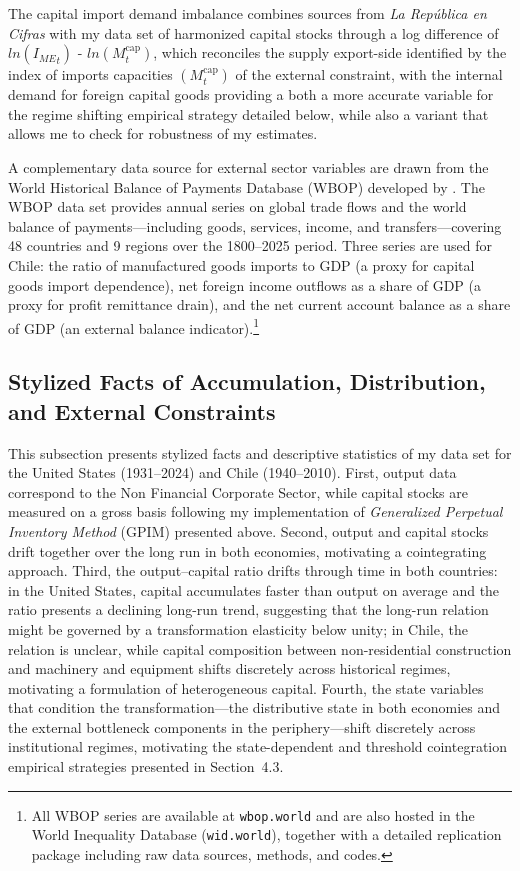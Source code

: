 The capital import demand imbalance combines sources from \textit{La República en Cifras} with my data set of harmonized capital stocks through a log difference of $ln({I_{ME}}_t)$ - $ln(M^{\text{cap}}_t)$, which reconciles the supply export-side identified by the index of imports capacities $(M^{\text{cap}}_t)$ of the external constraint, with the internal demand for foreign capital goods providing a both a more accurate variable for the regime shifting empirical strategy detailed below, while also a variant that allows me to check for robustness of my estimates. 

A complementary data source for external sector variables are drawn from the World Historical Balance of Payments Database (WBOP) developed by
\citet{NievasPiketty2025}. The WBOP data set provides annual series on global trade flows and the world balance of payments---including goods,
services, income, and transfers---covering 48 countries and 9 regions over
the 1800--2025 period. Three series are used for Chile: the ratio
of manufactured goods imports to GDP (a proxy for capital goods
import dependence), net foreign income outflows as a share of GDP (a
proxy for profit remittance drain), and the net current account
balance as a share of GDP (an external balance indicator).\footnote{All WBOP
	series are available at \texttt{wbop.world} and are also hosted in
	the World Inequality Database (\texttt{wid.world}), together with a
	detailed replication package including raw data sources, methods,
	and codes.}



\subsection{Stylized Facts of Accumulation, Distribution, and External Constraints}
\label{sec:4:stylized_facts}

This subsection presents stylized facts and descriptive statistics of my data set for the United States (1931--2024) and Chile (1940--2010). First, output data correspond to the Non Financial Corporate Sector, while capital stocks are measured on a gross basis following my implementation of \citet{Shaikh2016} \textit{Generalized Perpetual Inventory Method} (GPIM) presented above. Second, output and capital stocks drift together over the long run in both economies, motivating a cointegrating approach. Third, the output--capital ratio drifts through time in both countries: in the United States, capital accumulates faster than output on average and the ratio presents a declining long-run trend, suggesting that the long-run relation might be governed by a transformation elasticity below unity; in Chile, the relation is unclear, while capital composition between non-residential construction and machinery and equipment shifts discretely across historical regimes, motivating a formulation of heterogeneous capital. Fourth, the state variables that condition the transformation---the distributive state in both economies and the external bottleneck components in the periphery---shift discretely across institutional regimes, motivating the state-dependent and threshold cointegration empirical strategies presented in Section~4.3. 

